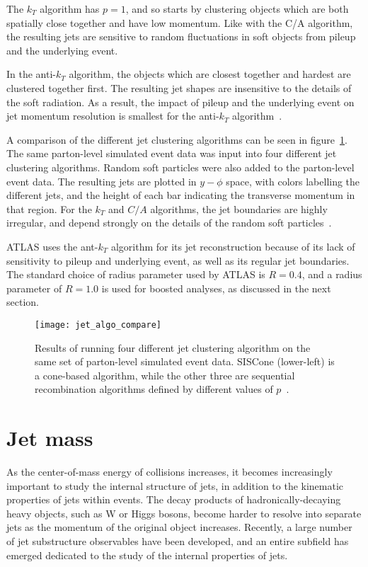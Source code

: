 The $k_T$ algorithm has $p=1$, and so starts by clustering objects which are both spatially close together and have low momentum.
Like with the C/A algorithm, the resulting jets are sensitive to random fluctuations in soft objects from pileup and the underlying event.

In the anti-$k_T$ algorithm, the objects which are closest together and hardest are clustered together first.
The resulting jet shapes are insensitive to the details of the soft radiation.
As a result, the impact of pileup and the underlying event on jet momentum resolution is smallest for the anti-$k_T$ algorithm~\cite{jet-antikt-algo}.

A comparison of the different jet clustering algorithms can be seen in figure~\ref{fig:jet_algo_compare}.
The same parton-level simulated event data was input into four different jet clustering algorithms.
Random soft particles were also added to the parton-level event data.
The resulting jets are plotted in $y-\phi$ space, with colors labelling the different jets, and the height of each bar indicating the transverse momentum in that region.
For the $k_T$ and $C/A$ algorithms, the jet boundaries are highly irregular, and depend strongly on the details of the random soft particles~\cite{jet-antikt-algo}.

ATLAS uses the ant-$k_T$ algorithm for its jet reconstruction because of its lack of sensitivity to pileup and underlying event, as well as its regular jet boundaries.
The standard choice of radius parameter used by ATLAS is $R=0.4$, and a radius parameter of $R=1.0$ is used for boosted analyses, as discussed in the next section.

\begin{figure}[!ht]
    \centering
\texttt{[image: jet\_algo\_compare]}
\caption{Results of running four different jet clustering algorithm on the same set of parton-level simulated event data.
SISCone (lower-left) is a cone-based algorithm, while the other three are sequential recombination algorithms defined
by different values of $p$~\cite{jet-antikt-algo}.}
\label{fig:jet_algo_compare}
\end{figure}

\section{Jet mass}\label{sec:jet_mass}

As the center-of-mass energy of collisions increases, it becomes increasingly important to study the internal structure of jets, in addition to the kinematic properties of jets within events.
The decay products of hadronically-decaying heavy objects, such as W or Higgs bosons, become harder to resolve into separate jets as the momentum of the original object increases.
Recently, a large number of jet substructure observables have been developed, and an entire subfield has emerged dedicated to the study of the internal properties of jets.

